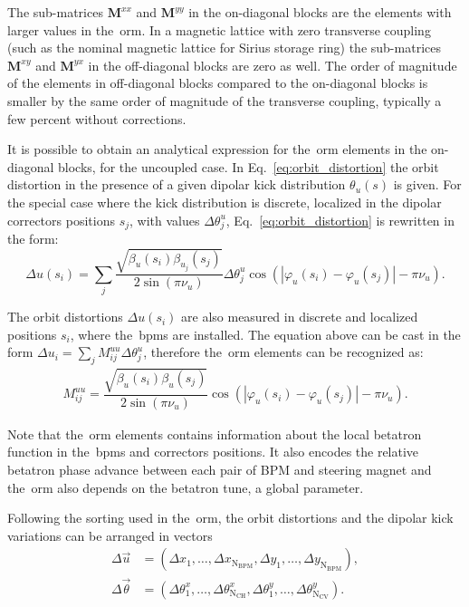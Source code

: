 The sub-matrices $\mathbf{M}^{xx}$ and $\mathbf{M}^{yy}$ in the on-diagonal blocks are the elements with larger values in the~\gls{orm}. In a magnetic lattice with zero transverse coupling (such as the nominal magnetic lattice for Sirius storage ring) the sub-matrices $\mathbf{M}^{xy}$ and $\mathbf{M}^{yx}$ in the off-diagonal blocks are zero as well. The order of magnitude of the elements in off-diagonal blocks compared to the on-diagonal blocks is smaller by the same order of magnitude of the transverse coupling, typically a few percent without corrections.

It is possible to obtain an analytical expression for the~\gls{orm} elements in the on-diagonal blocks, for the uncoupled case. In Eq.~\eqref{eq:orbit_distortion} the orbit distortion in the presence of a given dipolar kick distribution $\theta_u(s)$ is given. For the special case where the kick distribution is discrete, localized in the dipolar correctors positions $s_j$, with values $\Delta \theta^{u}_{j}$, Eq.~\eqref{eq:orbit_distortion} is rewritten in the form:
\begin{equation}
    \Delta u(s_i) = \sum_{j} \dfrac{\sqrt{\beta_{u}(s_i)\beta_{u_j}(s_j)}}{2\sin\left(\pi\nu_{u}\right)} \Delta \theta^{u}_j \cos\left( |\varphi_{u}(s_i) - \varphi_{u}(s_j)| - \pi\nu_{u} \right).
    \label{eq:discrete_orbit_distortion}
\end{equation}

The orbit distortions $\Delta u(s_i)$ are also measured in discrete and localized positions $s_i$, where the~\gls{bpm}s are installed. The equation above can be cast in the form $\Delta u_i = \sum_{j} M_{ij}^{uu} \Delta \theta_{j}^{u}$, therefore the~\gls{orm} elements can be recognized as:
\begin{align}
M_{ij}^{uu} = \dfrac{\sqrt{\beta_{u}(s_i)\beta_{u}(s_j)}}{2\sin\left(\pi\nu_{u}\right)}\cos\left( |\varphi_{u}(s_i) - \varphi_{u}(s_j)| - \pi\nu_{u} \right).
\label{eq:matrix_elements}
\end{align}

Note that the~\gls{orm} elements contains information about the local betatron function in the~\gls{bpm}s and correctors positions. It also encodes the relative betatron phase advance between each pair of BPM and steering magnet and the~\gls{orm} also depends on the betatron tune, a global parameter. 

Following the sorting used in the~\gls{orm}, the orbit distortions and the dipolar kick variations can be arranged in vectors
\begin{align*}
    \Delta \vec{u} &= \left(\Delta x_1, \ldots, \Delta x_{\mathrm{N}_{\mathrm{BPM}}}, \Delta y_1, \ldots, \Delta y_{\mathrm{N}_{\mathrm{BPM}}}\right), \\
    \Delta \vec{\theta} &= \left(\Delta \theta_1^x, \ldots, \Delta \theta_{\mathrm{N}_{\mathrm{CH}}}^x, \Delta \theta_1^y, \ldots, \Delta \theta_{\mathrm{N}_{\mathrm{CV}}}^y\right).
\end{align*}

